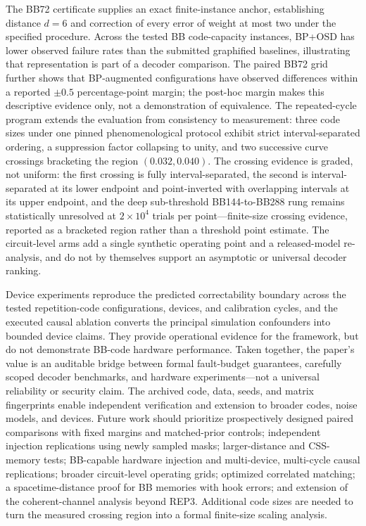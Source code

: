\documentclass[pdflatex,sn-mathphys-num]{sn-jnl}
\theoremstyle{thmstyleone}
\theoremstyle{thmstyletwo}
\theoremstyle{thmstylethree}
\begin{document}
The BB72 certificate supplies an exact finite-instance anchor, establishing distance $d=6$ and correction of every error of weight at most two under the specified procedure. Across the tested BB code-capacity instances, BP+OSD has lower observed failure rates than the submitted graphified baselines, illustrating that representation is part of a decoder comparison. The paired BB72 grid further shows that BP-augmented configurations have observed differences within a reported $\pm0.5$ percentage-point margin; the post-hoc margin makes this descriptive evidence only, not a demonstration of equivalence. The repeated-cycle program extends the evaluation from consistency to measurement: three code sizes under one pinned phenomenological protocol exhibit strict interval-separated ordering, a suppression factor collapsing to unity, and two successive curve crossings bracketing the region $(0.032,0.040)$. The crossing evidence is graded, not uniform: the first crossing is fully interval-separated, the second is interval-separated at its lower endpoint and point-inverted with overlapping intervals at its upper endpoint, and the deep sub-threshold BB144-to-BB288 rung remains statistically unresolved at $2\times10^{4}$ trials per point---finite-size crossing evidence, reported as a bracketed region rather than a threshold point estimate. The circuit-level arms add a single synthetic operating point and a released-model re-analysis, and do not by themselves support an asymptotic or universal decoder ranking.

Device experiments reproduce the predicted correctability boundary across the tested repetition-code configurations, devices, and calibration cycles, and the executed causal ablation converts the principal simulation confounders into bounded device claims. They provide operational evidence for the framework, but do not demonstrate BB-code hardware performance. Taken together, the paper's value is an auditable bridge between formal fault-budget guarantees, carefully scoped decoder benchmarks, and hardware experiments---not a universal reliability or security claim. The archived code, data, seeds, and matrix fingerprints enable independent verification and extension to broader codes, noise models, and devices. Future work should prioritize prospectively designed paired comparisons with fixed margins and matched-prior controls; independent injection replications using newly sampled masks; larger-distance and CSS-memory tests; BB-capable hardware injection and multi-device, multi-cycle causal replications; broader circuit-level operating grids; optimized correlated matching; a spacetime-distance proof for BB memories with hook errors; and extension of the coherent-channel analysis beyond REP3. Additional code sizes are needed to turn the measured crossing region into a formal finite-size scaling analysis.
\end{document}
